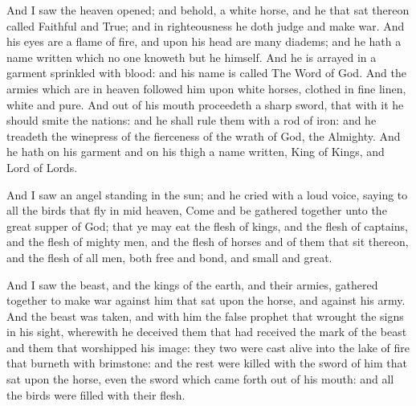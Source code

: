  And I saw the heaven opened; and behold, a white horse, and he that sat thereon called Faithful and True; and in righteousness he doth judge and make war. 
 And his eyes are a flame of fire, and upon his head are many diadems; and he hath a name written which no one knoweth but he himself. 
 And he is arrayed in a garment sprinkled with blood: and his name is called The Word of God. 
 And the armies which are in heaven followed him upon white horses, clothed in fine linen, white and pure. 
 And out of his mouth proceedeth a sharp sword, that with it he should smite the nations: and he shall rule them with a rod of iron: and he treadeth the winepress of the fierceness of the wrath of God, the Almighty. 
 And he hath on his garment and on his thigh a name written, King of Kings, and Lord of Lords.

 And I saw an angel standing in the sun; and he cried with a loud voice, saying to all the birds that fly in mid heaven, Come and be gathered together unto the great supper of God; 
 that ye may eat the flesh of kings, and the flesh of captains, and the flesh of mighty men, and the flesh of horses and of them that sit thereon, and the flesh of all men, both free and bond, and small and great.

 And I saw the beast, and the kings of the earth, and their armies, gathered together to make war against him that sat upon the horse, and against his army. 
 And the beast was taken, and with him the false prophet that wrought the signs in his sight, wherewith he deceived them that had received the mark of the beast and them that worshipped his image: they two were cast alive into the lake of fire that burneth with brimstone: 
 and the rest were killed with the sword of him that sat upon the horse, even the sword which came forth out of his mouth: and all the birds were filled with their flesh.